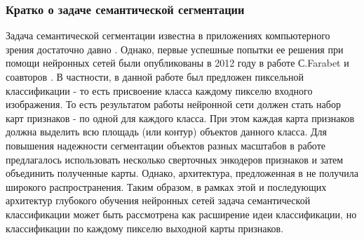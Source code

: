 \documentclass[12pt]{article}
\begin{document}
\begin{sloppypar}
\subsubsection{Кратко о задаче семантической сегментации}
Задача семантической сегментации известна в приложениях компьютерного зрения достаточно давно \cite{sultana2020evolution, thoma2016survey}.  Однако, первые успешные попытки ее решения при помощи нейронных сетей были опубликованы в 2012 году в работе С.Farabet и соавторов \cite{farabet2012learning}. В частности, в данной работе был предложен пиксельной классификации - то есть присвоение класса каждому пикселю входного изображения. То есть результатом работы нейронной сети должен стать набор карт признаков - по одной для каждого класса. При этом каждая карта признаков должна выделить всю площадь (или контур) объектов данного класса. Для повышения надежности сегментации объектов разных масштабов в работе предлагалось использовать несколько сверточных энкодеров признаков и затем объединить полученные карты. Однако, архитектура, предложенная в \cite{farabet2012learning} не получила широкого распространения. Таким образом, в рамках этой и последующих архитектур глубокого обучения нейронных сетей задача семантической классификации может быть рассмотрена как расширение идеи классификации, но классификации по каждому пикселю выходной карты признаков.


\end{sloppypar}
\end{document}
